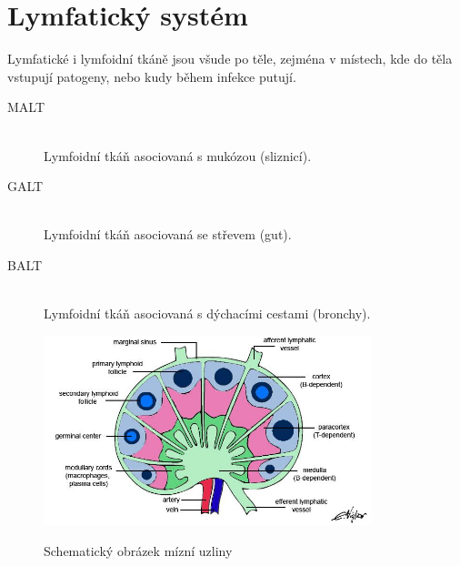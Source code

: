 \documentclass[DIV=8]{scrreprt}
\begin{document}
\section{Lymfatický systém} \label{Lymfatický systém} \FloatBarrier


Lymfatické i lymfoidní tkáně jsou všude po těle, zejména v místech, kde do těla vstupují patogeny, nebo kudy během infekce putují.

\begin{description}
\item[MALT]\hfill \\
Lymfoidní tkáň asociovaná s mukózou (sliznicí).


\item[GALT]\hfill \\
Lymfoidní tkáň asociovaná se střevem (gut).


\item[BALT]\hfill \\
Lymfoidní tkáň asociovaná s dýchacími cestami (bronchy).

\end{description}


\begin{figure}
    \caption{Schematický obrázek mízní uzliny}
    \includegraphics[width=0.85\textwidth]{uzlina.jpg}
    \centering
    \label{}
\end{figure}
\end{document}
